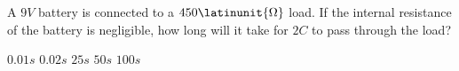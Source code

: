 \begin{questions}\setcounter{question}{25}\question
A $9 \unit{V}$ battery is connected to a $450\latinunit{\Omega}$ load. If the internal resistance of the battery is negligible, how long will it take for $2 \unit{C}$ to pass through the load?

\begin{oneparchoices}
\choice $0.01 \unit{s}$
\choice $0.02 \unit{s}$
\choice $25 \unit{s}$
\choice $50 \unit{s}$
\choice $100 \unit{s}$
\end{oneparchoices}\end{questions}


